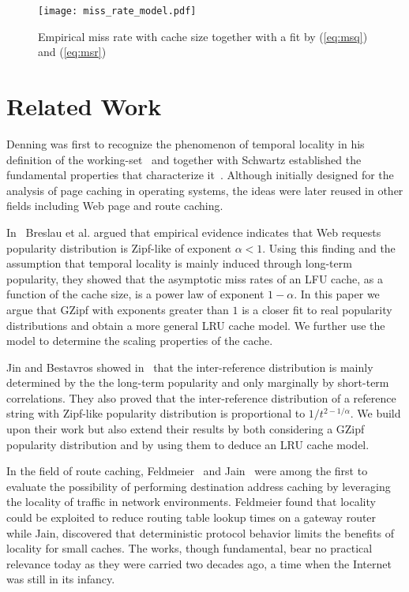 \documentclass[twocolumn, 10pt]{article}
\theoremstyle{plain}
\begin{document}
\begin{figure}[t]
    \centering
    \texttt{[image: miss\_rate\_model.pdf]}
    \caption{Empirical miss rate with cache size together with a fit by (\ref{eq:msq}) and
    (\ref{eq:msr})}
    \label{fig:mr_model}
\end{figure}
 
\section{Related Work}\label{sec:rw}
Denning was first to recognize the phenomenon of temporal locality in his
definition of the working-set~\cite{denning:ws_model} and together with
Schwartz established the fundamental properties that characterize
it~\cite{denning:ws_properties}. Although initially designed for the analysis
of page caching in operating systems, the ideas were later reused in other
fields including Web page and route caching.

In~\cite{breslau:web_and_zipf} Breslau et al. argued that empirical evidence
indicates that Web requests popularity distribution is Zipf-like of exponent
$\alpha < 1$. Using this finding and the assumption that temporal locality is
mainly induced through long-term popularity, they showed that the asymptotic
miss rates of an LFU cache, as a function of the cache size, is a power law of
exponent $1-\alpha$. In this paper we argue that GZipf with exponents greater
than $1$ is a closer fit to real popularity distributions and obtain a more
general LRU cache model. We further use the model to determine the scaling
properties of the cache. 

Jin and Bestavros showed in~\cite{jin:web_tloc} that the inter-reference
distribution is mainly determined by the the long-term popularity and only
marginally by short-term correlations. They also proved that the
inter-reference distribution of a reference string with Zipf-like popularity
distribution is proportional to $1/t^{2-1/\alpha}$. We build upon their work
but also extend their results by both considering a GZipf popularity
distribution and by using them to deduce an LRU cache model. 

In the field of route caching, Feldmeier~\cite{feldmeier:rt_cache} and
Jain~\cite{jain:dst_locality} were among the first to evaluate the possibility
of performing destination address caching by leveraging the locality of
traffic in network environments. Feldmeier found that locality could be
exploited to reduce routing table lookup times on a gateway router while Jain,
discovered that deterministic protocol behavior limits the benefits of
locality for small caches. The works, though fundamental, bear no practical
relevance today as they were carried two decades ago, a time when the Internet
was still in its infancy. 
\end{document}
